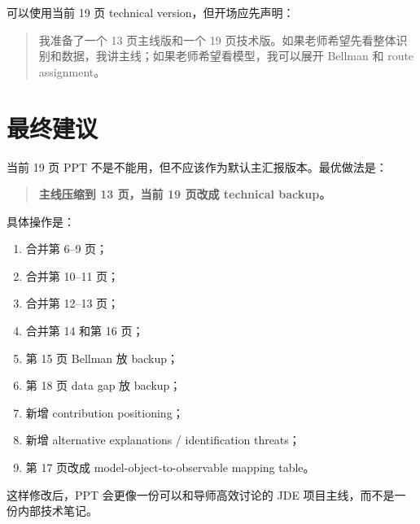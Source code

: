 \documentclass[12pt]{ctexart}
\begin{document}
可以使用当前 19 页 technical version，但开场应先声明：
\begin{quote}
我准备了一个 13 页主线版和一个 19 页技术版。如果老师希望先看整体识别和数据，我讲主线；如果老师希望看模型，我可以展开 Bellman 和 route assignment。
\end{quote}

\section{最终建议}

当前 19 页 PPT 不是不能用，但不应该作为默认主汇报版本。最优做法是：

\begin{quote}
\textbf{主线压缩到 13 页，当前 19 页改成 technical backup。}
\end{quote}

具体操作是：
\begin{enumerate}
    \item 合并第 6--9 页；
    \item 合并第 10--11 页；
    \item 合并第 12--13 页；
    \item 合并第 14 和第 16 页；
    \item 第 15 页 Bellman 放 backup；
    \item 第 18 页 data gap 放 backup；
    \item 新增 contribution positioning；
    \item 新增 alternative explanations / identification threats；
    \item 第 17 页改成 model-object-to-observable mapping table。
\end{enumerate}

这样修改后，PPT 会更像一份可以和导师高效讨论的 JDE 项目主线，而不是一份内部技术笔记。
\end{document}
